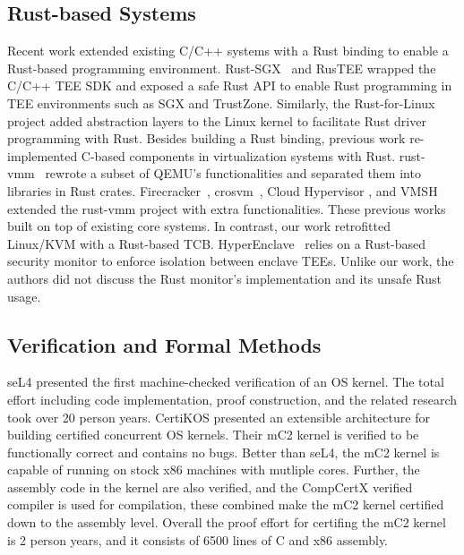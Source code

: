 \subsection{Rust-based Systems}
Recent work extended existing C/C++ systems with a Rust binding to enable
a Rust-based programming environment. Rust-SGX~\cite{rustsgx} and RusTEE
\cite{rustee} wrapped the C/C++ TEE SDK and exposed a safe Rust API
to enable Rust programming in TEE environments such as SGX and TrustZone.
Similarly, the Rust-for-Linux~\cite{Rust-for-Linux} project added
abstraction layers to the Linux kernel to facilitate Rust driver
programming with Rust.
Besides building a Rust binding, previous work re-implemented C-based
components in virtualization systems with Rust.
rust-vmm~\cite{rust-vmm} rewrote a subset of QEMU's functionalities
and separated them into libraries in Rust crates.
Firecracker~\cite{Firecracker}, crosvm~\cite{crosvm}, Cloud Hypervisor
\cite{CloudHypervisor}, and VMSH~\cite{VMSH} extended the
rust-vmm project with extra functionalities. These previous works
built on top of existing core systems. In contrast, our work
retrofitted Linux/KVM with a Rust-based TCB.
HyperEnclave~\cite{hyperenclave} relies on a Rust-based security
monitor to enforce isolation between enclave TEEs. Unlike
our work, the authors did not discuss the Rust monitor's implementation
and its unsafe Rust usage.

\subsection{Verification and Formal Methods}

seL4 \cite{sel4} presented the first machine-checked verification of an OS
kernel. The total effort including code implementation, proof construction,
and the related research took over 20 person years.
CertiKOS \cite{certikos} presented an extensible architecture for building
certified concurrent OS kernels. Their mC2 kernel is verified to be
functionally correct and contains no bugs. Better than seL4, the mC2 kernel
is capable of running on stock x86 machines with mutliple cores. Further,
the assembly code in the kernel are also verified, and the CompCertX verified
compiler is used for compilation, these combined make the mC2 kernel certified
down to the assembly level. Overall the proof effort for certifing the mC2
kernel is 2 person years, and it consists of 6500 lines of C and x86 assembly.

